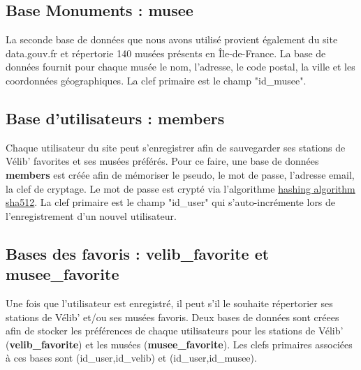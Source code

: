 \documentclass[a4paper]{article}
\begin{document}
\subsection{Base Monuments : \textbf{musee}}

La seconde base de données que nous avons utilisé provient également du site data.gouv.fr et répertorie 140 musées présents en Île-de-France. La base de données fournit pour chaque musée le nom, l'adresse, le code postal, la ville et les coordonnées géographiques. La clef primaire est le champ "id\_musee".

\subsection{Base d'utilisateurs : \textbf{members}}

Chaque utilisateur du site peut s'enregistrer afin de sauvegarder ses stations de Vélib' favorites et ses musées préférés. Pour ce faire, une base de données \textbf{members} est créée afin de mémoriser le pseudo, le mot de passe, l'adresse email, la clef de cryptage. Le mot de passe est crypté via l'algorithme \href{http://pajhome.org.uk/crypt/md5/sha512.html}{hashing algorithm sha512}. La clef primaire est le champ "id\_user" qui s'auto-incrémente lors de l'enregistrement d'un nouvel utilisateur. 

\subsection{Bases des favoris : \textbf{velib\_favorite} et \textbf{musee\_favorite}}

Une fois que l'utilisateur est enregistré, il peut s'il le souhaite répertorier ses stations de Vélib' et/ou ses musées favoris. Deux bases de données sont créees afin de stocker les préférences de chaque utilisateurs pour les stations de Vélib' (\textbf{velib\_favorite}) et les musées (\textbf{musee\_favorite}). Les clefs primaires associées à ces bases sont (id\_user,id\_velib) et (id\_user,id\_musee).
\end{document}

